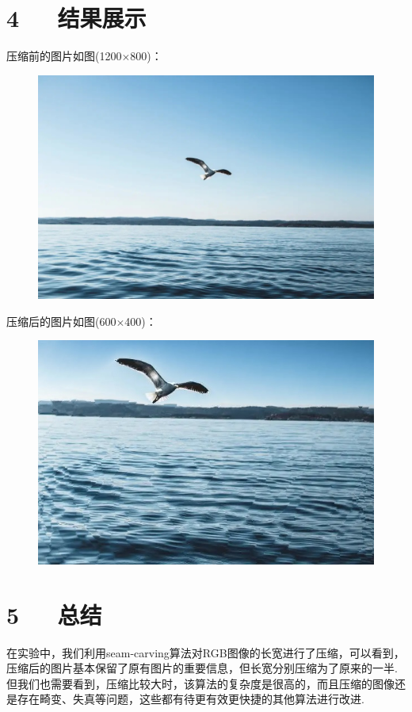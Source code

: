 \documentclass[UTF8]{ctexart}
\begin{document}
\section*{4\ \ \ 结果展示}
压缩前的图片如图(1200$\times$800)：
\begin{figure}[H]\begin{center}
	\includegraphics[scale = 0.5]{1.jpg}\end{center}
\end{figure}
压缩后的图片如图(600$\times$400)：
\begin{figure}[H]\begin{center}
	\includegraphics[scale = 0.5]{2.jpg}\end{center}
\end{figure}
\section*{5\ \ \ 总结}
在实验中，我们利用seam-carving算法对RGB图像的长宽进行了压缩，可以看到，压缩后的图片基本保留了原有图片的重要信息，但长宽分别压缩为了原来的一半. 但我们也需要看到，压缩比较大时，该算法的复杂度是很高的，而且压缩的图像还是存在畸变、失真等问题，这些都有待更有效更快捷的其他算法进行改进.
\end{document}
